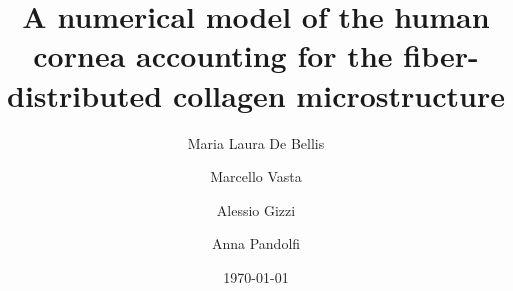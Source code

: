 \documentclass[preprint,12pt]{elsarticle}
\begin{document}
\begin{frontmatter}

\title{A numerical model of the human cornea accounting for the fiber-distributed collagen microstructure}

    \author[label1]{Maria Laura De Bellis}
    \author[label1]{Marcello Vasta}
    \author[label2]{Alessio Gizzi}
    \author[label3]{Anna Pandolfi}

    \address[label1]{
    Dipartimento INGEO,
    Universit\`a di Chieti-Pescara,
    Viale Pindaro 42,
    Pescara, Italy}
    
    \address[label2]{
    Department of Engineering,
    Universit\'a Campus Bio-Medico di Roma,
    Via A. del Portillo 21, 00128 Rome, Italy\\
    Research Unit of Nonlinear Physics and Mathematical Modeling}

    \address[label3]{
    Politecnico di Milano,
    Dipartimento di Ingegneria Civile ed Ambientale,
    Piazza Leonardo da Vinci 32,
    Milano, Italy
    }
    

    





\date{\today}


\end{frontmatter}
\end{document}
